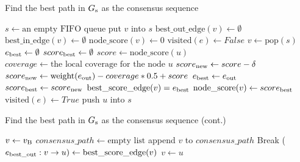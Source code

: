 \documentclass[11pt]{article}
\begin{document}
\begin{algorithm}[H]
\caption{Find the best path in $G_{\rm s}$ as the consensus sequence}          
\label{consensus}
\begin{algorithmic}[1]
\State $s \gets \textrm{an empty FIFO queue}$
		\State put $v$ into $s$
		\State $\textrm{best\_out\_edge}(v) \gets \emptyset$ 
		\State $\textrm{best\_in\_edge}(v) \gets \emptyset$
		\State $\textrm{node\_score}(v) \gets 0$  
	\EndIf
\EndFor	
{}
	\State $\textrm{visited}(e) \gets False$
\EndFor	
{}
	\State $v \gets \textrm{pop}(s)$
	\State $e_{\rm best} \gets \emptyset$
	\State $score_{\rm best} \gets \emptyset$
	 
		\State $score \gets \textrm{node\_score}(u)$
		\State $coverage \gets  \textrm{the local coverage for the node } u$
			\State $score_{\rm new} \gets score - \delta$  
		\Else
			\State $score_{\rm new} \gets \textrm{weight}(e_{\rm out}) - coverage * 0.5 + score$
		\EndIf
			\State $e_{\rm best} \gets e_{\rm out}$
			\State $score_{\rm best} \gets score_{\rm new}$
		\EndIf
	\EndFor
		\State $\textrm{best\_score\_edge}(v) = e_{\rm best}$
		\State $\textrm{node\_score}(v) \gets score_{\rm best}$ 
	\EndIf
		\State $\textrm{visited}(e) \gets True$	
	\EndFor
			\State push $u$ into $s$
		\EndIf
	\EndFor
\EndWhile
{}
\end{algorithmic}
\end{algorithm}  

\begin{algorithm}[H]
\caption{Find the best path in $G_{\rm s}$ as the consensus sequence (cont.)}          
\label{consensus2}
\begin{algorithmic}[1]
\State $v \gets v_{\rm B}$
\State $consensus\_path \gets \textrm{empty list}$
	\State append $v$ to $consensus\_path$
		\State Break
	\Else
		\State ($e_{\rm best\_out}:v \rightarrow u) \gets \textrm{best\_score\_edge}(v)$
		\State $v \gets u$
	\EndIf
\EndWhile
\end{algorithmic}
\end{algorithm}  
\end{document}

